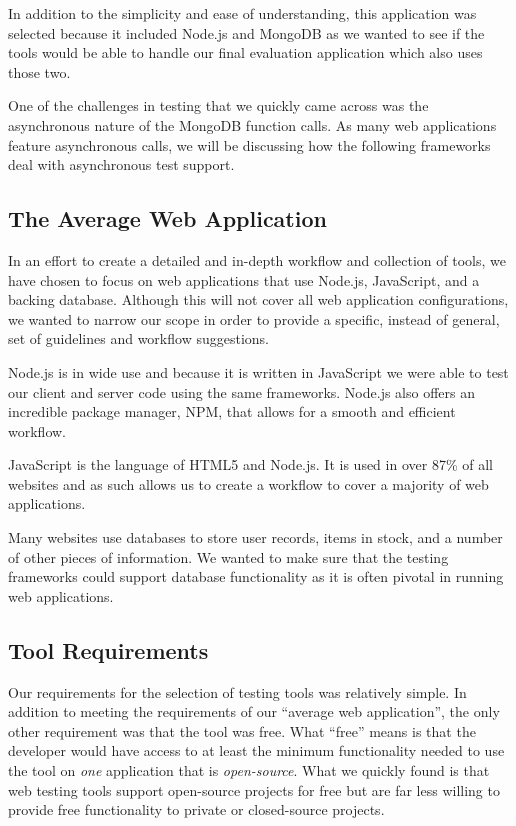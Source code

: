 \documentclass[12pt]{ucthesis}
\begin{document}
In addition to the simplicity and ease of understanding, this application was selected because it included Node.js and MongoDB as we wanted to see if the tools would be able to handle our final evaluation application which also uses those two.

One of the challenges in testing that we quickly came across was the asynchronous nature of the MongoDB function calls. As many web applications feature asynchronous calls, we will be discussing how the following frameworks deal with asynchronous test support.

\subsection{The Average Web Application}
In an effort to create a detailed and in-depth workflow and collection of tools, we have chosen to focus on web applications that use Node.js, JavaScript, and a backing database. Although this will not cover all web application configurations, we wanted to narrow our scope in order to provide a specific, instead of general, set of guidelines and workflow suggestions.

Node.js is in wide use and because it is written in JavaScript we were able to test our client and server code using the same frameworks. Node.js also offers an incredible package manager, NPM, that allows for a smooth and efficient workflow.

JavaScript is the language of HTML5 and Node.js. It is used in over 87\% of all websites \cite{JSUsage} and as such allows us to create a workflow to cover a majority of web applications.

Many websites use databases to store user records, items in stock, and a number of other pieces of information. We wanted to make sure that the testing frameworks could support database functionality as it is often pivotal in running web applications.

\subsection{Tool Requirements}
Our requirements for the selection of testing tools was relatively simple. In addition to meeting the requirements of our ``average web application'', the only other requirement was that the tool was free. What ``free'' means is that the developer would have access to at least the minimum functionality needed to use the tool on \emph{one} application that is \emph{open-source}. What we quickly found is that web testing tools support open-source projects for free but are far less willing to provide free functionality to private or closed-source projects. 
\end{document}
